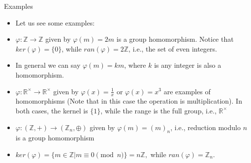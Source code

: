 \documentclass[ %
 10pt, xcolor={dvipsnames,svgnames,x11names,hyperref},
   hyperref={colorlinks=true,citecolor=green,linkcolor=DarkRed,urlcolor=ProcessBlue,anchorcolor=blue}
  ]{beamer}
\newenvironment{stepitemize}{\begin{itemize}[<+->]}{\end{itemize} }
\newcommand{\Z}{\mathbb{Z}}
\newcommand{\R}{\mathbb{R}}
\begin{document}
\begin{frame}{Examples}
\begin{stepitemize}
    \item Let us see some examples:
    \item $\varphi: \Z\rightarrow \Z$ given by $\varphi(m)=2m$
 is a group homomorphism. 
Notice that $ker(\varphi) = \{0\}$, while $ran(\varphi) = 2\Z$, i.e., the set of even integers. 

 \item In general we can say $\varphi(m)=km$, where $k$ is any integer is also a homomorphism. 
 \item $\varphi:\R^{\times} \rightarrow \R^{\times}$ given by $\varphi(x)=\frac{1}{x}$ or $\varphi(x)=x^3$ are examples of homomorphisms (Note that in this case the operation is multiplication). In both cases, the kernel is $\{1\}$, while the range is the full group, i.e., $\R^{\times}$  
 \item $\varphi:(\Z,+) \rightarrow (\Z_n, \oplus)$ given by 
 $\varphi(m) = (m)_n$, i.e., reduction modulo $n$ is a group homomorphism
 \item $ker(\varphi) = \{m\in \Z| m\equiv 0\pmod{n}\} = n\Z,$
 while $ran(\varphi) = \Z_n$.
\end{stepitemize}
    
\end{frame}
\end{document}
